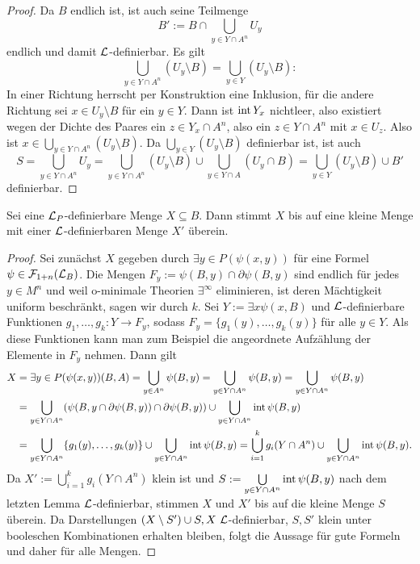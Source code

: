 \begin{proof}
	Da $B$ endlich ist, ist auch seine Teilmenge $$B':=B\cap\bigcup\limits_{y\in Y\cap A^n}U_y$$ endlich und damit $\mathcal{L}$-definierbar. Es gilt $$\bigcup\limits_{y\in Y\cap A^n}(U_y\setminus B)=\bigcup\limits_{y\in Y}(U_y\setminus B):$$ In einer Richtung herrscht per Konstruktion eine Inklusion, für die andere Richtung sei $x\in U_y\setminus B$ für ein $y\in Y$. Dann ist $\operatorname{int} Y_x$ nichtleer, also existiert wegen der Dichte des Paares ein $z\in Y_x\cap A^n$, also ein $z\in Y\cap A^n$ mit $x\in U_z$. Also ist $x\in\bigcup\limits_{y\in Y\cap A^n}(U_y\setminus B)$. Da $\bigcup\limits_{y\in Y}(U_y\setminus B)$ definierbar ist, ist auch $$S=\bigcup\limits_{y\in Y\cap A^n}U_y=\bigcup\limits_{y\in Y\cap A^n}(U_y\setminus B)\cup\bigcup\limits_{y\in Y\cap A}(U_y\cap B)=\bigcup\limits_{y\in Y}(U_y\setminus B)\cup B'$$ definierbar.
\end{proof}

\begin{lemma}
	Sei eine $\mathcal{L}_P$-definierbare Menge $X\subseteq B$. Dann stimmt $X$ bis auf eine kleine Menge mit einer $\mathcal{L}$-definierbaren Menge $X'$ überein.
\end{lemma}
\begin{proof}
	Sei zunächst $X$ gegeben durch $\exists y\in P(\psi(x,y))$ für eine Formel $\psi\in\mathcal{F}_{1+n}(\mathcal{L}_B)$. Die Mengen $F_y:=\psi(B,y)\cap\partial\psi(B,y)$ sind endlich für jedes $y\in M^n$ und weil o-minimale Theorien $\exists^\infty$ eliminieren, ist deren Mächtigkeit uniform beschränkt, sagen wir durch $k$. Sei $Y:=\exists x\psi(x,B)$ und $\mathcal{L}$-definierbare Funktionen $g_1,\dots,g_k:Y\rightarrow F_y$, sodass $F_y=\{g_1(y),\dots,g_k(y)\}$ für alle $y\in Y$. Als diese Funktionen kann man zum Beispiel die angeordnete Aufzählung der Elemente in $F_y$ nehmen. Dann gilt
	\begin{align*}
	X&=\exists y\in P(\psi(x,y))(B,A)=\bigcup\limits_{y\in A^n}\psi(B,y)=\bigcup\limits_{y\in Y\cap A^n}\psi(B,y)=\bigcup\limits_{y\in Y\cap A^n}\psi(B,y)\\&=\bigcup\limits_{y\in Y\cap A^n}(\psi(B,y\cap \partial\psi(B,y))\cap \partial\psi(B,y))\cup\bigcup\limits_{y\in Y\cap A^n}\operatorname{int}\psi(B,y)\\&=\bigcup\limits_{y\in Y\cap A^n}\{g_1(y),\dots,g_k(y)\}\cup\bigcup\limits_{y\in Y\cap A^n}\operatorname{int}\psi(B,y)=\bigcup\limits_{i=1}^kg_i(Y\cap A^n)\cup \bigcup\limits_{y\in Y\cap A^n}\operatorname{int}\psi(B,y).
	\end{align*}
	Da $X':=\bigcup\limits_{i=1}^kg_i(Y\cap A^n)$ klein ist und $S:=\bigcup\limits_{y\in Y\cap A^n}\operatorname{int}\psi(B,y)$ nach dem letzten Lemma $\mathcal{L}$-definierbar, stimmen $X$ und $X'$ bis auf die kleine Menge $S$ überein. Da Darstellungen \glqq{}$(X\setminus  S')\cup S,X\ \lingua$-definierbar, $S,S'$ klein\grqq{} unter booleschen Kombinationen erhalten bleiben, folgt die Aussage für gute Formeln und daher für alle Mengen.
\end{proof}

